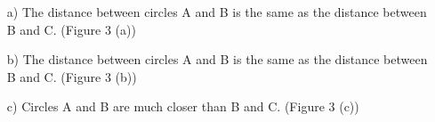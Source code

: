 \documentclass[11pt]{article}
\begin{document}
\begin{itemize}
\begin{enumerate}
  \item[a)]  The distance between circles A and B is the same as the distance between B and C. (Figure 3 (a))
  \item[b)] The distance between circles A and B is the same as the distance between B and C. (Figure 3 (b))
  \item[c)] Circles A and B are much closer than B and C. (Figure 3 (c))
\end{enumerate}

\end{itemize}
\end{document}
